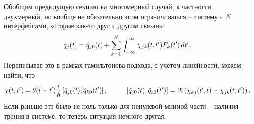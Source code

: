 Обобщим предыдущую секцию на многомерный случай, в частности двухмерный, но вообще не обязательно этим ограничиваться -- систему с $N$ интерфейсами, которые как-то друг с другом связаны
\begin{equation*}
	\hat{q}_j (t) = \hat{q}_{j0} (t) + \sum_{k=1}^{N} \int_{-\infty}^{\infty} \chi_{jk} (t, t') F_k(t') \, d t'.
\end{equation*}
Переписывая это в рамках гамильтонова подхода, с учётом линейности, можем найти, что
\begin{equation*}
	\chi(t, t') = \theta(t-t') \frac{i}{\hbar}\left[
		\hat{q}_{j0}(t), \hat{q}_{k0} (t')
	\right],
	\hspace{10 mm} 
	\left[\hat{q}_{j0}(t), \hat{q}_{k0} (t')\right] = i \hbar \left(
		\chi_{kj}(t', t) - \chi_{jk}(t, t')
	\right).
\end{equation*}
Если раньше это было не ноль только для ненулевой мнимой части -- наличия трения в системе, то теперь ситуация немного другая. 





